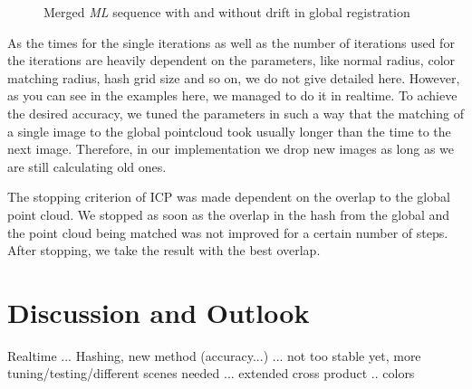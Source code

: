 \documentclass[10pt,twocolumn,letterpaper]{article}
\begin{document}
\begin{figure}
  \centering
  \caption{Merged \textit{ML} sequence with and without drift in global registration}
  \label{fig:globalregistration}
\end{figure}

As the times for the single iterations as well as the number of iterations used for the iterations are heavily dependent on the parameters, like
normal radius, color matching radius, hash grid size and so on, we do not give detailed here. However, as you can see in the examples here, we managed
to do it in realtime. To achieve the desired accuracy, we tuned the parameters in such a way that the matching of a single image to the global pointcloud
took usually longer than the time to the next image. Therefore, in our implementation we drop new images as long as we are still calculating old ones.

The stopping criterion of ICP was made dependent on the overlap to the global point cloud. We stopped as soon as the overlap in the hash from the global
and the point cloud being matched was not improved for a certain number of steps. After stopping, we take the result with the best overlap.

\section{Discussion and Outlook}
Realtime ... Hashing, new method (accuracy...) ... not too stable yet, more tuning/testing/different scenes needed ... extended cross product .. colors
\end{document}
